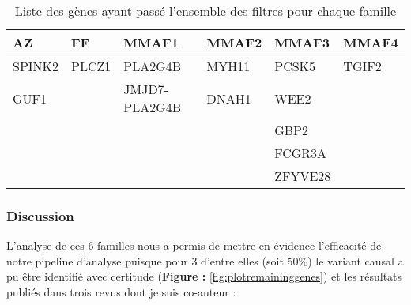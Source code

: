 \documentclass[12pt,twoside]{reedthesis}
\theoremstyle{definition}
\theoremstyle{definition}
\theoremstyle{remark}
\begin{document}
  \newpage
  
  \begin{table}
  
  \caption{\label{tab:tablegene}Liste des gènes ayant passé l'ensemble des filtres pour chaque famille}
  \centering
  \begin{tabular}[t]{l|l|l|l|l|l}
  \hline
  AZ & FF & MMAF1 & MMAF2 & MMAF3 & MMAF4\\
  \hline
  SPINK2 & PLCZ1 & PLA2G4B & MYH11 & PCSK5 & TGIF2\\
  \hline
  GUF1 &  & JMJD7-PLA2G4B & DNAH1 & WEE2 & \\
  \hline
   &  &  &  & GBP2 & \\
  \hline
   &  &  &  & FCGR3A & \\
  \hline
   &  &  &  & ZFYVE28 & \\
  \hline
  \end{tabular}
  \end{table}
  
  \newpage 
  
  \subsubsection{Discussion}\label{discussion}
  
  L'analyse de ces 6 familles nous a permis de mettre en évidence
  l'efficacité de notre pipeline d'analyse puisque pour 3 d'entre elles
  (soit 50\%) le variant causal a pu être identifié avec certitude
  (\textbf{Figure : }\ref{fig:plotremaininggenes}) et les résultats
  publiés dans trois revus dont je suis co-auteur :
  
\end{document}
